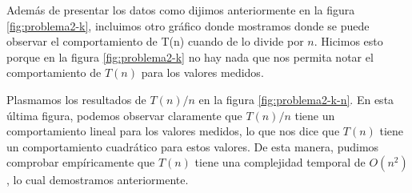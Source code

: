 Además de presentar los datos como dijimos anteriormente en la figura \ref{fig:problema2-k}, incluimos otro gráfico donde mostramos donde se puede observar el comportamiento de T(n) cuando de lo divide por $n$. Hicimos esto porque en la figura \ref{fig:problema2-k} no hay nada que nos permita notar el comportamiento de $T(n)$ para los valores medidos.

Plasmamos los resultados de $T(n)/n$ en la figura \ref{fig:problema2-k-n}. En esta última figura, podemos observar claramente que $T(n) / n$ tiene un comportamiento lineal para los valores medidos, lo que nos dice que $T(n)$ tiene un comportamiento cuadrático para estos valores. De esta manera, pudimos comprobar empíricamente que $T(n)$ tiene una complejidad temporal de $O(n^2)$, lo cual demostramos anteriormente.